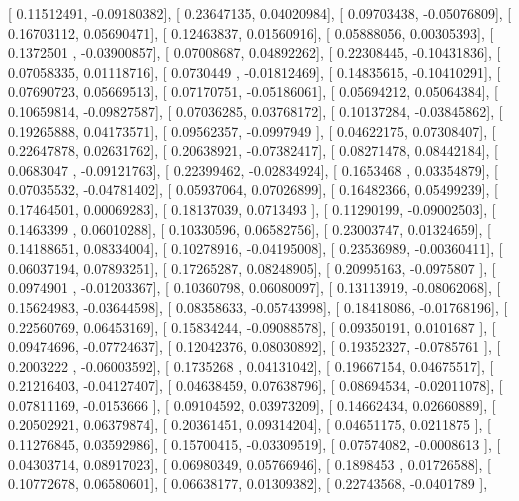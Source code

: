 \documentclass{article}
\begin{document}
       [ 0.11512491, -0.09180382],
       [ 0.23647135,  0.04020984],
       [ 0.09703438, -0.05076809],
       [ 0.16703112,  0.05690471],
       [ 0.12463837,  0.01560916],
       [ 0.05888056,  0.00305393],
       [ 0.1372501 , -0.03900857],
       [ 0.07008687,  0.04892262],
       [ 0.22308445, -0.10431836],
       [ 0.07058335,  0.01118716],
       [ 0.0730449 , -0.01812469],
       [ 0.14835615, -0.10410291],
       [ 0.07690723,  0.05669513],
       [ 0.07170751, -0.05186061],
       [ 0.05694212,  0.05064384],
       [ 0.10659814, -0.09827587],
       [ 0.07036285,  0.03768172],
       [ 0.10137284, -0.03845862],
       [ 0.19265888,  0.04173571],
       [ 0.09562357, -0.0997949 ],
       [ 0.04622175,  0.07308407],
       [ 0.22647878,  0.02631762],
       [ 0.20638921, -0.07382417],
       [ 0.08271478,  0.08442184],
       [ 0.0683047 , -0.09121763],
       [ 0.22399462, -0.02834924],
       [ 0.1653468 ,  0.03354879],
       [ 0.07035532, -0.04781402],
       [ 0.05937064,  0.07026899],
       [ 0.16482366,  0.05499239],
       [ 0.17464501,  0.00069283],
       [ 0.18137039,  0.0713493 ],
       [ 0.11290199, -0.09002503],
       [ 0.1463399 ,  0.06010288],
       [ 0.10330596,  0.06582756],
       [ 0.23003747,  0.01324659],
       [ 0.14188651,  0.08334004],
       [ 0.10278916, -0.04195008],
       [ 0.23536989, -0.00360411],
       [ 0.06037194,  0.07893251],
       [ 0.17265287,  0.08248905],
       [ 0.20995163, -0.0975807 ],
       [ 0.0974901 , -0.01203367],
       [ 0.10360798,  0.06080097],
       [ 0.13113919, -0.08062068],
       [ 0.15624983, -0.03644598],
       [ 0.08358633, -0.05743998],
       [ 0.18418086, -0.01768196],
       [ 0.22560769,  0.06453169],
       [ 0.15834244, -0.09088578],
       [ 0.09350191,  0.0101687 ],
       [ 0.09474696, -0.07724637],
       [ 0.12042376,  0.08030892],
       [ 0.19352327, -0.0785761 ],
       [ 0.2003222 , -0.06003592],
       [ 0.1735268 ,  0.04131042],
       [ 0.19667154,  0.04675517],
       [ 0.21216403, -0.04127407],
       [ 0.04638459,  0.07638796],
       [ 0.08694534, -0.02011078],
       [ 0.07811169, -0.0153666 ],
       [ 0.09104592,  0.03973209],
       [ 0.14662434,  0.02660889],
       [ 0.20502921,  0.06379874],
       [ 0.20361451,  0.09314204],
       [ 0.04651175,  0.0211875 ],
       [ 0.11276845,  0.03592986],
       [ 0.15700415, -0.03309519],
       [ 0.07574082, -0.0008613 ],
       [ 0.04303714,  0.08917023],
       [ 0.06980349,  0.05766946],
       [ 0.1898453 ,  0.01726588],
       [ 0.10772678,  0.06580601],
       [ 0.06638177,  0.01309382],
       [ 0.22743568, -0.0401789 ],
\end{document}
